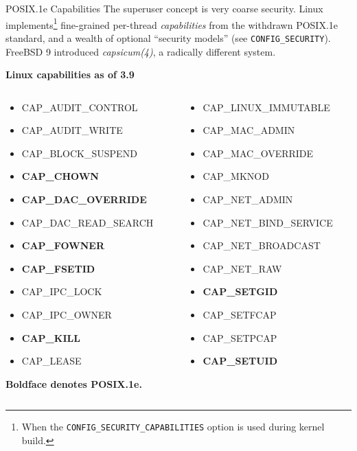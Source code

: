 \documentclass[mathserif,xcolor={dvipsnames,table}]{beamer}
\begin{document}
\begin{frame}{POSIX.1e Capabilities}
\footnotesize{The superuser concept is very coarse security. Linux
implements\footnote{\tiny{When the {\tt CONFIG\_SECURITY\_CAPABILITIES} option is used during kernel build.}}
fine-grained per-thread \textit{capabilities} from the withdrawn POSIX.1e standard, and a
wealth of optional ``security models'' (see {\tt CONFIG\_SECURITY}). FreeBSD 9
introduced \textit{capsicum(4)}, a radically different system.}
\begin{center}\footnotesize{\textbf{Linux capabilities as of 3.9}}\end{center}
\tiny{
\begin{columns}
\begin{column}{.33\textwidth}
\begin{itemize}
\item CAP\_AUDIT\_CONTROL
\item CAP\_AUDIT\_WRITE
\item CAP\_BLOCK\_SUSPEND
\item \textbf{CAP\_CHOWN}
\item \textbf{CAP\_DAC\_OVERRIDE}
\item CAP\_DAC\_READ\_SEARCH
\item \textbf{CAP\_FOWNER}
\item \textbf{CAP\_FSETID}
\item CAP\_IPC\_LOCK
\item CAP\_IPC\_OWNER
\item \textbf{CAP\_KILL}
\item CAP\_LEASE
\end{itemize}
\hfill \textbf{Boldface denotes POSIX.1e.}
\end{column}
\begin{column}{.33\textwidth}
\begin{itemize}
\item CAP\_LINUX\_IMMUTABLE
\item CAP\_MAC\_ADMIN
\item CAP\_MAC\_OVERRIDE
\item CAP\_MKNOD
\item CAP\_NET\_ADMIN
\item CAP\_NET\_BIND\_SERVICE
\item CAP\_NET\_BROADCAST
\item CAP\_NET\_RAW
\item \textbf{CAP\_SETGID}
\item CAP\_SETFCAP
\item CAP\_SETPCAP
\item \textbf{CAP\_SETUID}

\end{itemize}
\end{column}
\end{columns}}
\end{frame}
\end{document}
